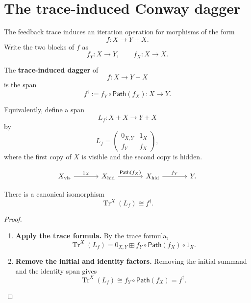 \section{The trace-induced Conway dagger}
\label{sec:trace-induced-conway-dagger}

The feedback trace induces an iteration operation for morphisms of the form
\[
  f:X\to Y+X.
\]
Write the two blocks of \(f\) as
\[
  f_Y:X\to Y,
  \qquad
  f_X:X\to X.
\]

\begin{definition}
\label{def:trace-induced-dagger-feedback}
The \textbf{trace-induced dagger} of
\[
  f:X\to Y+X
\]
is the span
\[
  f^\dagger
  :=
  f_Y\circ\mathsf{Path}(f_X)
  :
  X\to Y.
\]
\end{definition}

Equivalently, define a span
\[
  L_f:X+X\to Y+X
\]
by
\[
  L_f=
  \begin{pmatrix}
    0_{X,Y} & 1_X\\
    f_Y & f_X
  \end{pmatrix},
\]
where the first copy of \(X\) is visible and the second copy is hidden.

\[
\begin{tikzcd}[column sep=large,row sep=large]
  X_{\mathrm{vis}}
    \ar[r,"1_X"]
  &
  X_{\mathrm{hid}}
    \ar[r,"\mathsf{Path}(f_X)"]
  &
  X_{\mathrm{hid}}
    \ar[r,"f_Y"]
  &
  Y .
\end{tikzcd}
\]

\begin{proposition}
\label{prop:dagger-as-trace-feedback}
There is a canonical isomorphism
\[
  \operatorname{Tr}^{X}(L_f)
  \cong
  f^\dagger.
\]
\end{proposition}

\begin{proof}
\begin{enumerate}
  \item \textbf{Apply the trace formula.}
  By the trace formula,
  \[
    \operatorname{Tr}^{X}(L_f)
    =
    0_{X,Y}
    \boxplus
    f_Y\circ\mathsf{Path}(f_X)\circ1_X.
  \]

  \item \textbf{Remove the initial and identity factors.}
  Removing the initial summand and the identity span gives
  \[
    \operatorname{Tr}^{X}(L_f)
    \cong
    f_Y\circ\mathsf{Path}(f_X)
    =
    f^\dagger.
  \]
\end{enumerate}
\end{proof}

